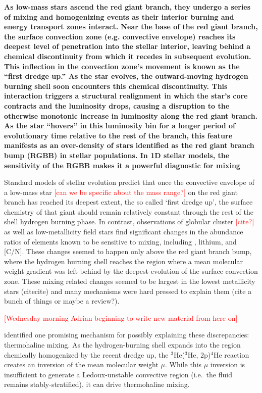 \textbf{As low-mass stars ascend the red giant branch, they undergo a series of mixing and homogenizing events as their interior burning and energy transport zones interact. Near the base of the red giant branch, the surface convection zone (e.g. convective envelope) reaches its deepest level of penetration into the stellar interior, leaving behind a chemical discontinuity from which it recedes in subsequent evolution. This inflection in the convection zone's movement is known as the ``first dredge up.'' As the star evolves, the outward-moving hydrogen burning shell soon encounters this chemical discontinuity. This interaction triggers a structural realignment in which the star's core contracts and the luminosity drops, causing a disruption to the otherwise monotonic increase in luminosity along the red giant branch. As the star ``hovers'' in this luminosity bin for a longer period of evolutionary time relative to the rest of the branch, this feature manifests as an over-density of stars identified as the red giant branch bump (RGBB) in stellar populations. In 1D stellar models, the sensitivity of the RGBB makes it a powerful diagnostic for mixing }

Standard models of stellar evolution predict that once the convective envelope of a low-mass star \textcolor{red}{[can we be specific about the mass range?]} on the red giant branch has reached its deepest extent, the so called `first dredge up', the surface chemistry of that giant should remain relatively constant through the rest of the shell hydrogen burning phase. 
In contrast, observations of globular cluster \textcolor{red}{[cite?]} as well as low-metallicity field stars \citep{Gratton2000} find significant changes in the abundance ratios of elements known to be sensitive to mixing, including \ctwelvecthirteen, lithium, and [C/N]. 
These changes seemed to happen only above the red giant branch bump, where the hydrogen burning shell reaches the region where a mean molecular weight gradient was left behind by the deepest evolution of the surface convection zone. These mixing related changes seemed to be largest in the lowest metallicity stars (citecite) and many mechanisms were hard pressed to explain them (cite a bunch of things or maybe a review?). 

\textcolor{red}{[Wednesday morning Adrian beginning to write new material from here on]}

\citet{charbonnel_thermohaline_2007} identified one promising mechanism for possibly explaining these discrepancies: thermohaline mixing. As the hydrogen-burning shell expands into the region chemically homogenized by the recent dredge up, the $^3$He($^3$He, 2p)$^4$He reaction creates an inversion of the mean molecular weight $\mu$. While this $\mu$ inversion is insufficient to generate a Ledoux-unstable convective region (i.e.~the fluid remains stably-stratified), it can drive thermohaline mixing. 

